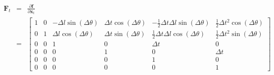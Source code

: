 \documentclass[12pt, a4paper]{article}
\begin{document}
\begin{eqnarray*}
  \bm{F}_{t} & = & \frac{\partial\bm{f}}{\partial\bm{x}_{t}}\\
  & = & \begin{bmatrix}
  1 & 0 & -\Delta l\sin(\Delta\theta) & \Delta t\cos(\Delta\theta) & -\frac{1}{2}\Delta t\Delta l\sin(\Delta\theta) & \frac{1}{2}\Delta t^2\cos(\Delta\theta)\\
  0 & 1 & \Delta l\cos(\Delta\theta) & \Delta t\sin(\Delta\theta) & \frac{1}{2}\Delta t\Delta l\cos(\Delta\theta) & \frac{1}{2}\Delta t^2\sin(\Delta\theta)\\
  0 & 0 & 1 & 0 & \Delta t & 0\\
  0 & 0 & 0 & 1 & 0 & \Delta t\\
  0 & 0 & 0 & 0 & 1 & 0\\
  0 & 0 & 0 & 0 & 0 & 1
  \end{bmatrix}
\end{eqnarray*}
\end{document}
